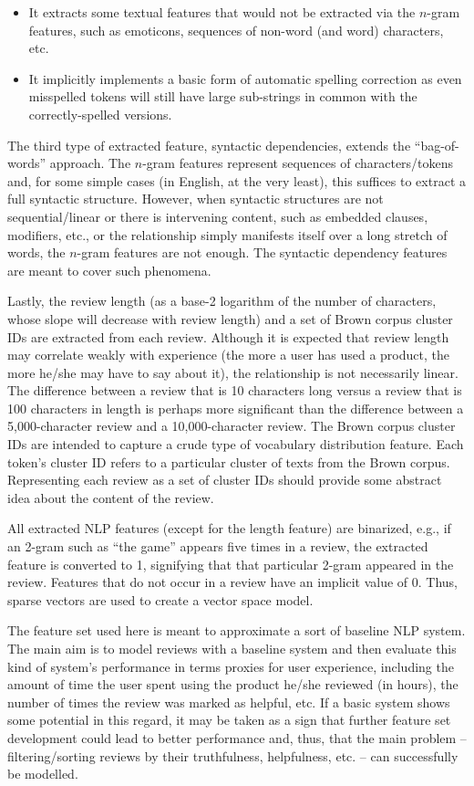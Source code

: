 \documentclass[9pt]{article}
\begin{document}
\begin{itemize}
\item It extracts some textual features that would not be extracted via the $n$-gram features, such as emoticons, sequences of non-word (and word) characters, etc.
\item It implicitly implements a basic form of automatic spelling correction as even misspelled tokens will still have large sub-strings in common with the correctly-spelled versions.
\end{itemize}

The third type of extracted feature, syntactic dependencies, extends the ``bag-of-words'' approach. The $n$-gram features represent sequences of characters/tokens and, for some simple cases (in English, at the very least), this suffices to extract a full syntactic structure. However, when syntactic structures are not sequential/linear or there is intervening content, such as embedded clauses, modifiers, etc., or the relationship simply manifests itself over a long stretch of words, the $n$-gram features are not enough. The syntactic dependency features are meant to cover such phenomena.

Lastly, the review length (as a base-2 logarithm of the number of characters, whose slope will decrease with review length) and a set of Brown corpus cluster IDs are extracted from each review. Although it is expected that review length may correlate weakly with experience (the more a user has used a product, the more he/she may have to say about it), the relationship is not necessarily linear. The difference between a review that is 10 characters long versus a review that is 100 characters in length is perhaps more significant than the difference between a 5,000-character review and a 10,000-character review. The Brown corpus cluster IDs are intended to capture a crude type of vocabulary distribution feature. Each token's cluster ID refers to a particular cluster of texts from the Brown corpus. Representing each review as a set of cluster IDs should provide some abstract idea about the content of the review.

All extracted NLP features (except for the length feature) are binarized, e.g., if an 2-gram such as ``the game'' appears five times in a review, the extracted feature is converted to 1, signifying that that particular 2-gram appeared in the review. Features that do not occur in a review have an implicit value of 0. Thus, sparse vectors are used to create a vector space model.

The feature set used here is meant to approximate a sort of baseline NLP system. The main aim is to model reviews with a baseline system and then evaluate this kind of system's performance in terms proxies for user experience, including the amount of time the user spent using the product he/she reviewed (in hours), the number of times the review was marked as helpful, etc. If a basic system shows some potential in this regard, it may be taken as a sign that further feature set development could lead to better performance and, thus, that the main problem -- filtering/sorting reviews by their truthfulness, helpfulness, etc. -- can successfully be modelled.
\end{document}

